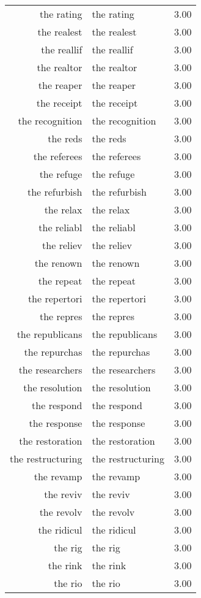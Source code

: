\begin{table}[ht]
\begin{tabular}{rlr}
  the rating & the rating & 3.00 \\ 
  the realest & the realest & 3.00 \\ 
  the reallif & the reallif & 3.00 \\ 
  the realtor & the realtor & 3.00 \\ 
  the reaper & the reaper & 3.00 \\ 
  the receipt & the receipt & 3.00 \\ 
  the recognition & the recognition & 3.00 \\ 
  the reds & the reds & 3.00 \\ 
  the referees & the referees & 3.00 \\ 
  the refuge & the refuge & 3.00 \\ 
  the refurbish & the refurbish & 3.00 \\ 
  the relax & the relax & 3.00 \\ 
  the reliabl & the reliabl & 3.00 \\ 
  the reliev & the reliev & 3.00 \\ 
  the renown & the renown & 3.00 \\ 
  the repeat & the repeat & 3.00 \\ 
  the repertori & the repertori & 3.00 \\ 
  the repres & the repres & 3.00 \\ 
  the republicans & the republicans & 3.00 \\ 
  the repurchas & the repurchas & 3.00 \\ 
  the researchers & the researchers & 3.00 \\ 
  the resolution & the resolution & 3.00 \\ 
  the respond & the respond & 3.00 \\ 
  the response & the response & 3.00 \\ 
  the restoration & the restoration & 3.00 \\ 
  the restructuring & the restructuring & 3.00 \\ 
  the revamp & the revamp & 3.00 \\ 
  the reviv & the reviv & 3.00 \\ 
  the revolv & the revolv & 3.00 \\ 
  the ridicul & the ridicul & 3.00 \\ 
  the rig & the rig & 3.00 \\ 
  the rink & the rink & 3.00 \\ 
  the rio & the rio & 3.00 \\ 

\end{tabular}
\end{table}
